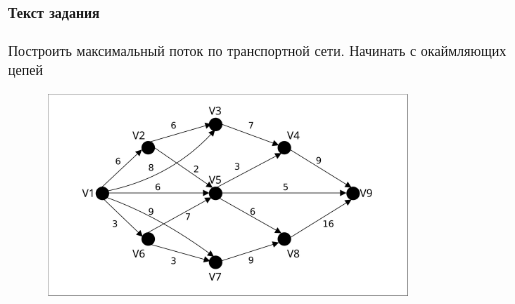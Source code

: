 \documentclass[a4paper, 12pt]{article}
\begin{document}
\paragraph{Текст задания} Построить максимальный поток по транспортной сети. Начинать с окаймляющих цепей
\begin{figure}[h]
    \includegraphics[width=360px]{7_flow}
\end{figure}
\end{document}
